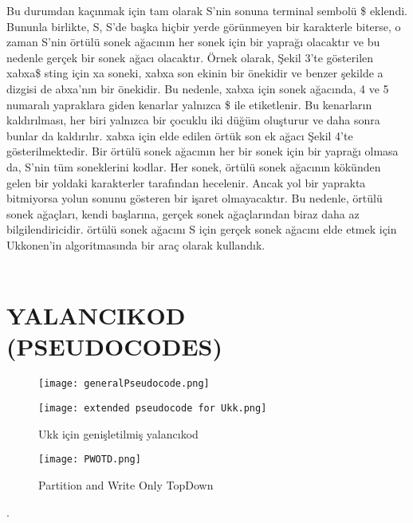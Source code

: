 \documentclass[conference]{IEEEtran}
\begin{document}
Bu durumdan kaçınmak için tam olarak S'nin sonuna terminal sembolü \$ eklendi. Bununla birlikte, S, S'de başka hiçbir yerde görünmeyen bir karakterle biterse, o zaman S'nin örtülü sonek ağacının her sonek için bir yaprağı olacaktır ve bu nedenle gerçek bir sonek ağacı olacaktır. Örnek olarak, Şekil 3'te gösterilen xabxa\$ sting için xa soneki, xabxa son ekinin bir önekidir ve benzer şekilde a dizgisi de abxa'nın bir önekidir. Bu nedenle, xabxa için sonek ağacında, 4 ve 5 numaralı yapraklara giden kenarlar yalnızca \$ ile etiketlenir. Bu kenarların kaldırılması, her biri yalnızca bir çocuklu iki düğüm oluşturur ve daha sonra bunlar da kaldırılır. xabxa için elde edilen örtük son ek ağacı Şekil 4'te gösterilmektedir. Bir örtülü sonek ağacının her bir sonek için bir yaprağı olmasa da, S'nin tüm soneklerini kodlar. Her sonek, örtülü sonek ağacının kökünden gelen bir yoldaki karakterler tarafından hecelenir. Ancak yol bir yaprakta bitmiyorsa yolun sonunu gösteren bir işaret olmayacaktır. Bu nedenle, örtülü sonek ağaçları, kendi başlarına, gerçek sonek ağaçlarından biraz daha az bilgilendiricidir. örtülü sonek ağacını S için gerçek sonek ağacını elde etmek için Ukkonen'in algoritmasında bir araç olarak kullandık.\\\\


\section*{\textbf{\LARGE YALANCIKOD (PSEUDOCODES)}}

\begin{figure}[h]
    \centering
    \texttt{[image: generalPseudocode.png]}
\end{figure}
\begin{figure}[h]
    \centering
    \texttt{[image: extended pseudocode for Ukk.png]}
    \caption{Ukk için genişletilmiş yalancıkod}
\end{figure}

\begin{figure}[h]
    \centering
    \texttt{[image: PWOTD.png]}
    \caption{ Partition and Write Only TopDown}
    
\end{figure}




.\\\\\\\\\\\\\\\\\
\end{document}
